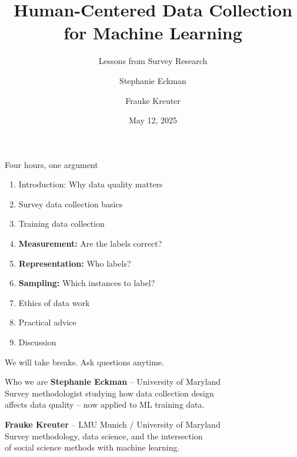 \documentclass[aspectratio=169,11pt]{beamer}
\title{Human-Centered Data Collection\\for Machine Learning}
\subtitle{Lessons from Survey Research}
\author{Stephanie Eckman \and Frauke Kreuter}
\institute{AAPOR Conference Short Course}
\date{May 12, 2025}
\begin{document}

\maketitle

\begin{frame}{Four hours, one argument}
\begin{enumerate}
  \item Introduction: Why data quality matters
  \item Survey data collection basics
  \item Training data collection
  \item \textbf{Measurement:} Are the labels correct?
  \item \textbf{Representation:} Who labels?
  \item \textbf{Sampling:} Which instances to label?
  \item Ethics of data work
  \item Practical advice
  \item Discussion
\end{enumerate}

\vspace{1em}
\small We will take breaks. Ask questions anytime.
\end{frame}

\begin{frame}{Who we are}
\textbf{Stephanie Eckman} -- University of Maryland\\[0.5em]
Survey methodologist studying how data collection design\\
affects data quality -- now applied to ML training data.

\vspace{1.5em}

\textbf{Frauke Kreuter} -- LMU Munich / University of Maryland\\[0.5em]
Survey methodology, data science, and the intersection\\
of social science methods with machine learning.
\end{frame}
\end{document}
